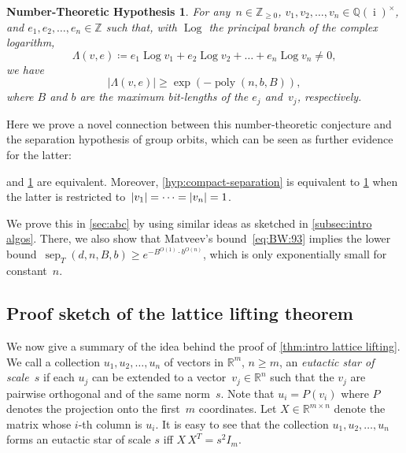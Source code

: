 \documentclass[a4paper,USenglish,cleveref,numberwithinsect]{lipics-v2021}
\newtheorem{numhypothesis}[theorem]{Number-Theoretic Hypothesis}\crefname{numhypothesis}{Number-Theoretic Hypothesis}{Number-Theoretic Hypotheses}
\DeclareMathOperator{\poly}{poly}
\DeclareMathOperator{\sep}{sep}
\DeclareMathOperator{\ii}{i}
\DeclareMathOperator{\Log}{Log}
\newcommand{\QQ}{\mathbb{Q}}
\newcommand{\ZZ}{\mathbb{Z}}
\newcommand{\RR}{\mathbb{R}}
\newcommand{\NN}{\mathbb{Z}_{\geq 0}}
\DeclarePairedDelimiter\abs{\lvert}{\rvert}
\numberwithin{equation}{section}
\begin{document}
\begin{numhypothesis}\label{hyp:linearforms}
For any~$n\in\NN$, $v_1,v_2,\dots,v_n\in\QQ(\ii)^\times$, and $e_1,e_2,\dots,e_n\in\ZZ$ such that,
with $\Log$ the principal branch of the complex logarithm,
\[
  \Lambda(v,e) \coloneqq e_1 \Log v_1 + e_2 \Log v_2 +\dots +e_n\Log v_n \neq 0,
\]
we have
\[
	|\Lambda(v,e)| \geq \exp(-\poly(n,b,B)),
\]
where $B$ and $b$ are the maximum bit-lengths of the $e_j$ and~$v_j$, respectively.
\end{numhypothesis}

Here we prove a novel connection between this number-theoretic conjecture and
the separation hypothesis of group orbits, which can be seen as further evidence for the latter:

\begin{theorem}\label{thm:abc-and-sep}
 and \cref{hyp:linearforms} are equivalent.
Moreover, \cref{hyp:compact-separation} is equivalent to \cref{hyp:linearforms}
when the latter is restricted to~$\abs{v_1}=\dots=\abs{v_n}=1$.
\end{theorem}

We prove this in \cref{sec:abc} by using similar ideas as sketched in \cref{subsec:intro algos}.
There, we also show that Matveev's bound~\eqref{eq:BW:93} implies
the lower bound~$\sep_T(d,n,B,b) \geq e^{-B^{O(1)} \cdot b^{O(n)}}$,
which is only exponentially small for constant~$n$.

\subsection{Proof sketch of the lattice lifting theorem}\label{subsec:proof ideas}
We now give a summary of the idea behind the proof of \cref{thm:intro lattice lifting}.
We call a collection $u_1,u_2,\dots,u_n$ of vectors in $\RR^m$, $n\ge m$,
an \emph{eutactic star of scale~$s$}
if each $u_j$ can be extended to a vector~$v_j\in\RR^n$ such that the $v_j$ are pairwise orthogonal
and of the same norm~$s$.
Note that $u_i=P(v_i)$ where $P$ denotes the projection onto the first~$m$ coordinates.
Let $X\in\RR^{m\times n}$ denote the matrix whose $i$-th column is $u_i$.
It is easy to see that the collection $u_1,u_2,\dots,u_n$ forms an eutactic star of scale $s$
iff $X\, X^T = s^2 I_m$.
\end{document}
